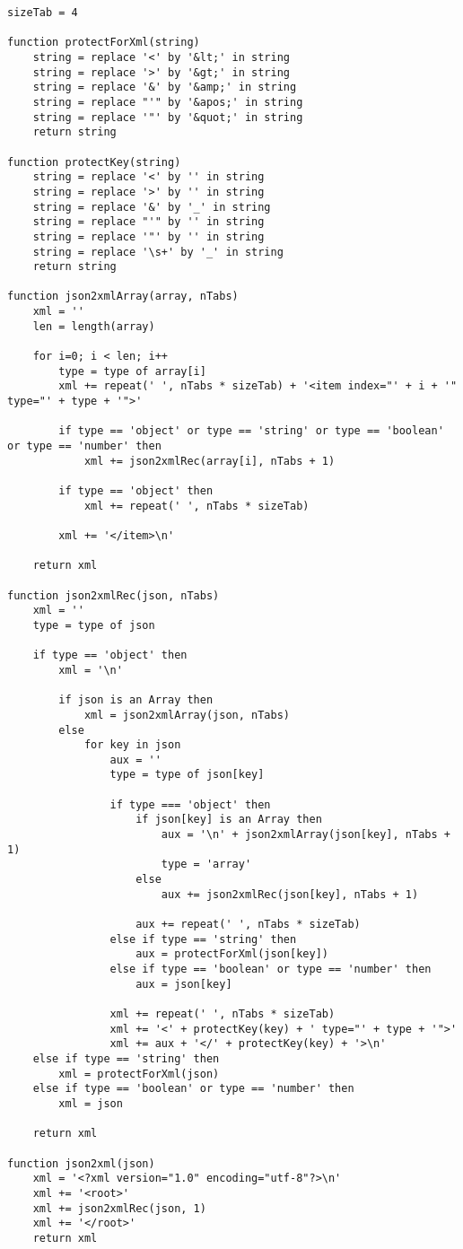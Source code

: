 \begin{lstlisting}[language=pseudocode, caption=Algoritmo de conversão de \acrshort{json} para \acrshort{xml}]
sizeTab = 4

function protectForXml(string)
    string = replace '<' by '&lt;' in string
    string = replace '>' by '&gt;' in string
    string = replace '&' by '&amp;' in string
    string = replace "'" by '&apos;' in string
    string = replace '"' by '&quot;' in string
    return string

function protectKey(string)
    string = replace '<' by '' in string
    string = replace '>' by '' in string
    string = replace '&' by '_' in string
    string = replace "'" by '' in string
    string = replace '"' by '' in string
    string = replace '\s+' by '_' in string
    return string

function json2xmlArray(array, nTabs)
    xml = ''
    len = length(array)

    for i=0; i < len; i++
        type = type of array[i]
        xml += repeat(' ', nTabs * sizeTab) + '<item index="' + i + '" type="' + type + '">' 

        if type == 'object' or type == 'string' or type == 'boolean' or type == 'number' then
            xml += json2xmlRec(array[i], nTabs + 1)

        if type == 'object' then
            xml += repeat(' ', nTabs * sizeTab)

        xml += '</item>\n'

    return xml

function json2xmlRec(json, nTabs)
    xml = ''
    type = type of json
    
    if type == 'object' then
        xml = '\n'

        if json is an Array then
            xml = json2xmlArray(json, nTabs)
        else
            for key in json
                aux = ''
                type = type of json[key]

                if type === 'object' then
                    if json[key] is an Array then
                        aux = '\n' + json2xmlArray(json[key], nTabs + 1)
                        type = 'array'
                    else
                        aux += json2xmlRec(json[key], nTabs + 1)
                    
                    aux += repeat(' ', nTabs * sizeTab)
                else if type == 'string' then
                    aux = protectForXml(json[key])
                else if type == 'boolean' or type == 'number' then
                    aux = json[key]

                xml += repeat(' ', nTabs * sizeTab)
                xml += '<' + protectKey(key) + ' type="' + type + '">'
                xml += aux + '</' + protectKey(key) + '>\n'
    else if type == 'string' then
        xml = protectForXml(json)
    else if type == 'boolean' or type == 'number' then
        xml = json

    return xml

function json2xml(json)
    xml = '<?xml version="1.0" encoding="utf-8"?>\n'
    xml += '<root>'
    xml += json2xmlRec(json, 1)
    xml += '</root>'
    return xml
\end{lstlisting}

